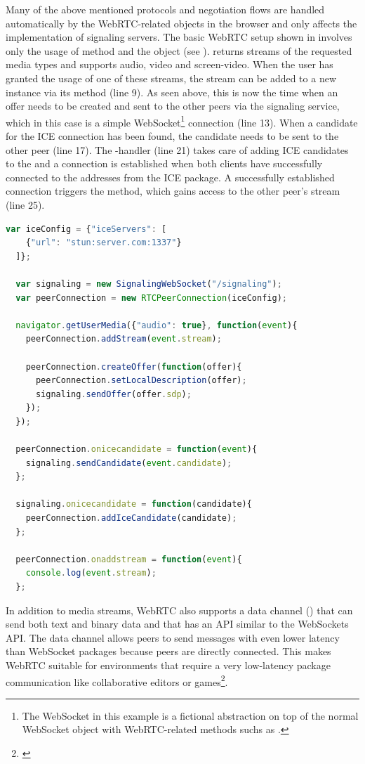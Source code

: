 Many of the above mentioned protocols and negotiation flows are handled automatically by the WebRTC-related objects in the browser and only affects the implementation of signaling servers. The basic WebRTC setup shown in  involves only the usage of  method and the  object (see ).  returns streams of the requested media types and supports audio, video and screen-video. When the user has granted the usage of one of these streams, the stream can be added to a new  instance via its  method (line 9). As seen above, this is now the time when an offer needs to be created and sent to the other peers via the signaling service, which in this case is a simple WebSocket\footnote{The WebSocket in this example is a fictional abstraction on top of the normal WebSocket object with WebRTC-related methods suchs as .} connection (line 13). When a candidate for the ICE connection has been found, the candidate needs to be sent to the other peer (line 17). The -handler (line 21) takes care of adding ICE candidates to the  and a connection is established when both clients have successfully connected to the addresses from the ICE package. A successfully established connection triggers the  method, which gains access to the other peer's stream (line 25).

\begin{lstlisting}[language=JavaScript, caption=Connecting peers with WebRTC, label=lst:webrtc]
  var iceConfig = {"iceServers": [
    {"url": "stun:server.com:1337"}
  ]};

  var signaling = new SignalingWebSocket("/signaling");
  var peerConnection = new RTCPeerConnection(iceConfig);

  navigator.getUserMedia({"audio": true}, function(event){
    peerConnection.addStream(event.stream);

    peerConnection.createOffer(function(offer){
      peerConnection.setLocalDescription(offer);
      signaling.sendOffer(offer.sdp);
    });
  });

  peerConnection.onicecandidate = function(event){
    signaling.sendCandidate(event.candidate);
  };

  signaling.onicecandidate = function(candidate){
    peerConnection.addIceCandidate(candidate);
  };

  peerConnection.onaddstream = function(event){
    console.log(event.stream);
  };
\end{lstlisting}

In addition to media streams, WebRTC also supports a data channel () that can send both text and binary data and that has an API similar to the WebSockets API. The data channel allows peers to send messages with even lower latency than WebSocket packages because peers are directly connected. This makes WebRTC suitable for environments that require a very low-latency package communication like collaborative editors or games\footnote{\cite[p. 109]{johnston2012webrtc}}.